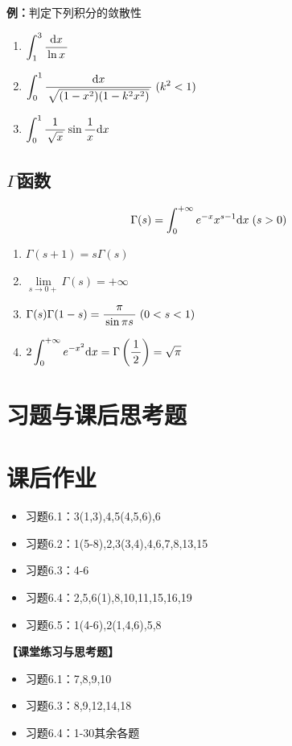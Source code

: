 {\bf 例：}判定下列积分的敛散性
\begin{enumerate}[(1)]
  \setlength{\itemindent}{1cm}
  \item $\displaystyle\int_1^3\displaystyle\frac{\,{\mathrm{d} x}\,}{\,{\ln x}\,}$ 
  \item $\displaystyle\int_0^1\displaystyle\frac{\,{\mathrm{d} x}\,}{\,{\sqrt{(1-x^2)(1-k^2x^2)}}\,}\;(k^2<1)$ 
  \item $\displaystyle\int_0^1\displaystyle\frac{\,{1}\,}{\,{\sqrt{x}}\,}\sin\displaystyle\frac{\,{1}\,}{\,{x}\,}\mathrm{d} x$
\end{enumerate}

\subsection{$\Gamma$函数}

$${\Gamma(s)=\displaystyle\int_0^{+\infty}e^{-x}x^{s-1}\mathrm{d} x\;(s>0)}$$

\begin{enumerate}[(1)]
  \setlength{\itemindent}{1cm}
  \item $\Gamma(s+1)=s\Gamma(s)$ 
  \item $\lim\limits_{s\to 0+}\Gamma(s)= +\infty$ 
  \item $\Gamma(s)\Gamma(1-s)=\displaystyle\frac{\,{\pi}\,}{\,{\sin \pi s}\,}\;(0<s<1)$ 
  \item $2\displaystyle\int_0^{+\infty}e^{-x^2}\mathrm{d} x=\Gamma\left(\displaystyle\frac{\,{1}\,}{\,{2}\,}\right)=\sqrt{\pi}$
\end{enumerate}


\newpage

\section*{习题与课后思考题}

\section*{课后作业}

\begin{itemize}
  \item 习题6.1：3(1,3),4,5(4,5,6),6
  \item 习题6.2：1(5-8),2,3(3,4),4,6,7,8,13,15
  \item 习题6.3：4-6
  \item 习题6.4：2,5,6(1),8,10,11,15,16,19
  \item 习题6.5：1(4-6),2(1,4,6),5,8
\end{itemize}

{\bf 【课堂练习与思考题】}

\begin{itemize}
  \item 习题6.1：7,8,9,10
  \item 习题6.3：8,9,12,14,18
  \item 习题6.4：1-30其余各题
\end{itemize}

